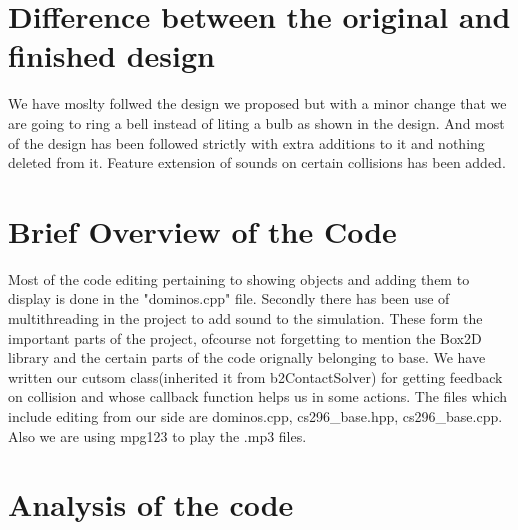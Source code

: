 \documentclass[a4paper,11pt]{article}
\begin{document}
\begin{itemize}
\section{Difference between the original and finished design}
We have moslty follwed the design we proposed but with a minor change that we are going to ring a bell instead of liting a bulb as shown in the design. And most of the design has been followed strictly with extra additions to it and nothing deleted from it. Feature extension of sounds on certain collisions has been added.



\section{Brief Overview of the Code}
	Most of the code editing pertaining to showing objects and adding them to display is done in the "dominos.cpp" file. Secondly there has been use of multithreading in the project to add sound to the simulation. These form the important parts of the project, ofcourse not forgetting to mention the Box2D library and the certain parts of the code orignally belonging to base.
	We have written our cutsom class(inherited it from b2ContactSolver) for getting feedback on collision and whose callback function helps us in some actions. 
	The files which include editing from our side are dominos.cpp, cs296\_base.hpp, cs296\_base.cpp. Also we are using mpg123 to play the .mp3 files.

\section{Analysis of the code}

\end{itemize}
\end{document}
